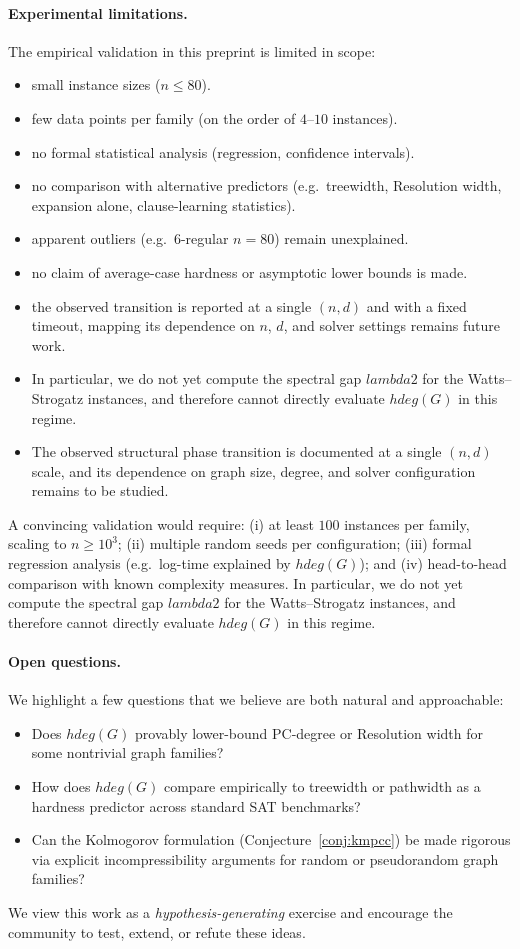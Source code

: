 \documentclass[11pt,a4paper]{article}
\def\gap{lambda2}%
\def\hdeg{hdeg}%
\theoremstyle{remark}
\newcommand{\gap}{\lambda_2}
\newcommand{\hdeg}{\widehat{\deg}}
\begin{document}
\paragraph{Experimental limitations.}
The empirical validation in this preprint is limited in scope:
\begin{itemize}
  \item small instance sizes ($n \leq 80$).
  \item few data points per family (on the order of $4$--$10$ instances).
  \item no formal statistical analysis (regression, confidence intervals).
  \item no comparison with alternative predictors (e.g.\ treewidth, Resolution width,
        expansion alone, clause-learning statistics).
  \item apparent outliers (e.g.\ 6-regular $n=80$) remain unexplained.
  \item no claim of average-case hardness or asymptotic lower bounds is made.
  \item the observed transition is reported at a single $(n,d)$ and with a fixed timeout,
      mapping its dependence on $n$, $d$, and solver settings remains future work.
  \item In particular, we do not yet compute the spectral gap $\gap$ for the Watts--Strogatz instances,
      and therefore cannot directly evaluate $\hdeg(G)$ in this regime.
  \item The observed structural phase transition is documented at a single $(n,d)$ scale,
      and its dependence on graph size, degree, and solver configuration remains to be studied.
\end{itemize}
A convincing validation would require: (i) at least $100$ instances per family, scaling
to $n \geq 10^3$; (ii) multiple random seeds per configuration; (iii) formal regression
analysis (e.g.\ log-time explained by $\hdeg(G)$); and (iv) head-to-head comparison with
known complexity measures.
In particular, we do not yet compute the spectral gap $\gap$ for the Watts--Strogatz instances,
and therefore cannot directly evaluate $\hdeg(G)$ in this regime.

\paragraph{Open questions.}
We highlight a few questions that we believe are both natural and approachable:
\begin{itemize}
  \item Does $\hdeg(G)$ provably lower-bound PC-degree or Resolution width for some
        nontrivial graph families?
  \item How does $\hdeg(G)$ compare empirically to treewidth or pathwidth as a hardness
        predictor across standard SAT benchmarks?
  \item Can the Kolmogorov formulation (Conjecture~\ref{conj:kmpcc}) be made rigorous
        via explicit incompressibility arguments for random or pseudorandom graph families?
\end{itemize}
We view this work as a \emph{hypothesis-generating} exercise and encourage the community
to test, extend, or refute these ideas.
\end{document}
